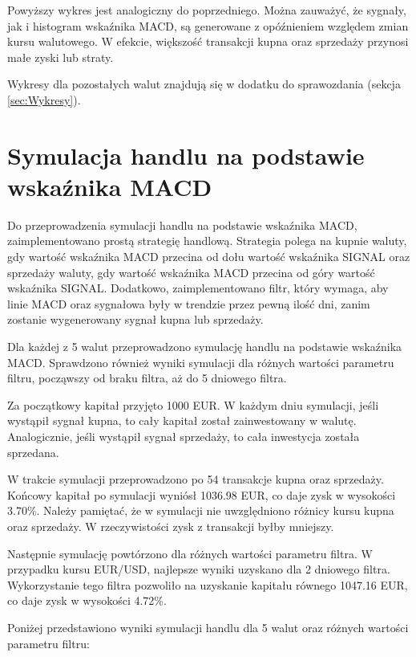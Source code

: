 \documentclass[12pt, a4paper]{article}
\begin{document}
Powyższy wykres jest analogiczny do poprzedniego. Można zauważyć, że sygnały, jak i histogram
wskaźnika MACD, są generowane z opóźnieniem względem zmian kursu walutowego. W efekcie, większość 
transakcji  kupna oraz sprzedaży przynosi małe zyski lub straty.

Wykresy dla pozostałych walut znajdują się w dodatku do sprawozdania (sekcja \ref{sec:Wykresy}).


\section{Symulacja handlu na podstawie wskaźnika MACD}

Do przeprowadzenia symulacji handlu na podstawie wskaźnika MACD, zaimplementowano
prostą strategię handlową. Strategia polega na kupnie waluty, gdy wartość wskaźnika MACD
przecina od dołu wartość wskaźnika SIGNAL oraz sprzedaży waluty, gdy wartość wskaźnika MACD
przecina od góry wartość wskaźnika SIGNAL.
Dodatkowo, zaimplementowano filtr, który wymaga, aby linie MACD oraz sygnałowa były w trendzie
przez pewną ilość dni, zanim zostanie wygenerowany sygnał kupna lub sprzedaży.

Dla każdej z 5 walut przeprowadzono symulację handlu na podstawie wskaźnika MACD. Sprawdzono również
wyniki symulacji dla różnych wartości parametru filtru, począwszy od braku filtra, aż do 5 dniowego filtra.

Za początkowy kapitał przyjęto 1000 EUR. W każdym dniu symulacji, jeśli wystąpił sygnał kupna, to cały kapitał
został zainwestowany w walutę. Analogicznie, jeśli wystąpił sygnał sprzedaży, to cała inwestycja została sprzedana.

W trakcie symulacji przeprowadzono po 54 transakcje kupna oraz sprzedaży.
Końcowy kapitał po symulacji wyniósł 1036.98 EUR, co daje zysk w wysokości 3.70\%.
Należy pamiętać, że w symulacji nie uwzględniono różnicy kursu kupna oraz sprzedaży.
W rzeczywistości zysk z transakcji byłby mniejszy.

Następnie symulację powtórzono dla różnych wartości parametru filtra.
W przypadku kursu EUR/USD, najlepsze wyniki uzyskano dla 2 dniowego filtra.
Wykorzystanie tego filtra pozwoliło na uzyskanie kapitału równego 1047.16 EUR,
co daje zysk w wysokości 4.72\%.

\pagebreak







Poniżej przedstawiono wyniki symulacji handlu dla 5 walut oraz różnych wartości parametru filtru:
\end{document}
